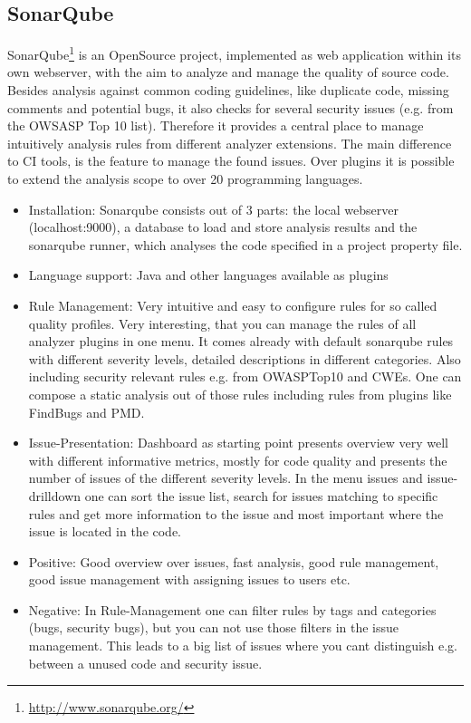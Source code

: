 \documentclass[conference]{IEEEtran}
\begin{document}
\subsection{SonarQube}
\label{subsec:sonarqube}
SonarQube\footnote{\href{http://www.sonarqube.org/}{http://www.sonarqube.org/}} is an OpenSource project, implemented as web application within its own webserver, with the aim to analyze and manage the quality of source code. 
Besides analysis against common coding guidelines, like duplicate code, missing comments and potential bugs, it also checks for several security issues (e.g. from the OWSASP Top 10 list).
Therefore it provides a central place to manage intuitively analysis rules from different analyzer extensions.
The main difference to CI tools, is the feature to manage the found issues.
Over plugins it is possible to extend the analysis scope to over 20 programming languages.


\begin{itemize}
\item Installation: Sonarqube consists out of 3 parts: the local webserver (localhost:9000), a database to load and store analysis results and the sonarqube runner, which analyses the code specified in a project property file.

\item Language support: Java and other languages available as plugins

\item Rule Management: Very intuitive and easy to configure rules for so called quality profiles. Very interesting, that you can manage the rules of all analyzer plugins in one menu. It comes already with default sonarqube rules with different severity levels, detailed descriptions in different categories. Also including security relevant rules e.g. from OWASPTop10 and CWEs. One can compose a static analysis out of those rules including rules from plugins like FindBugs and PMD.

\item Issue-Presentation: Dashboard as starting point presents overview very well with different informative metrics, mostly for code quality and presents the number of issues of the different severity levels.
In the menu issues and issue-drilldown one can sort the issue list, search for issues matching to specific rules and get more information to the issue and most important where the issue is located in the code.

\item Positive: Good overview over issues, fast analysis, good rule management, good issue management with assigning issues to users etc.

\item Negative: In Rule-Management one can filter rules by tags and categories (bugs, security bugs), but you can not use those filters in the issue management. This leads to a big list of issues where you cant distinguish e.g. between a unused code and security issue.
 
\end{itemize}
\end{document}
